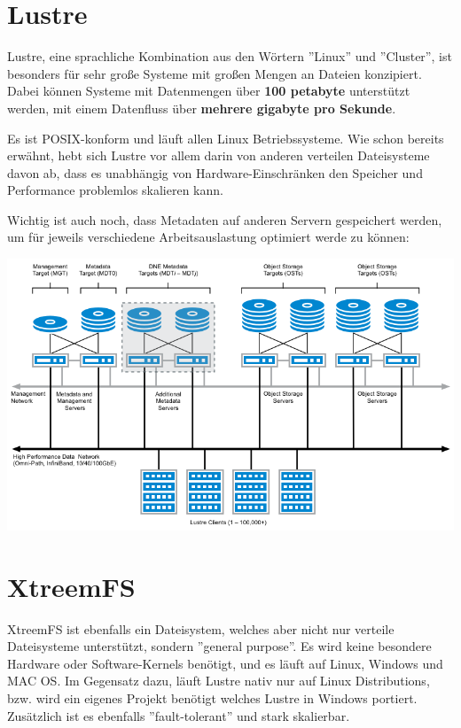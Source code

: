 
\section{Lustre}
Lustre, eine sprachliche Kombination aus den Wörtern ''Linux'' und ''Cluster'', ist besonders für sehr große Systeme mit großen Mengen an Dateien konzipiert. Dabei können Systeme mit Datenmengen über \textbf{100 petabyte} unterstützt werden, mit einem Datenfluss über \textbf{mehrere gigabyte pro Sekunde}. \cite{Lustrea}

Es ist POSIX-konform und läuft allen Linux Betriebssysteme. Wie schon bereits erwähnt, hebt sich Lustre vor allem darin von anderen verteilen Dateisysteme davon ab, dass es unabhängig von Hardware-Einschränken den Speicher und Performance problemlos skalieren kann. \cite{Lustreb}

Wichtig ist auch noch, dass Metadaten auf anderen Servern gespeichert werden, um für jeweils verschiedene Arbeitsauslastung optimiert werde zu können:

\begin{minipage}{\linewidth}
	\centering
	\includegraphics[width=0.8\linewidth]{images/architektur.png}
\end{minipage}

\section{XtreemFS}
XtreemFS ist ebenfalls ein Dateisystem, welches aber nicht nur verteile Dateisysteme unterstützt, sondern ''general purpose''. Es wird keine besondere Hardware oder Software-Kernels benötigt, und es läuft auf Linux, Windows und MAC OS. Im Gegensatz dazu, läuft Lustre nativ nur auf Linux Distributions, bzw. wird ein eigenes Projekt benötigt welches Lustre in Windows portiert. Zusätzlich ist es ebenfalls ''fault-tolerant'' und stark skalierbar. \cite{XtreemFS}

